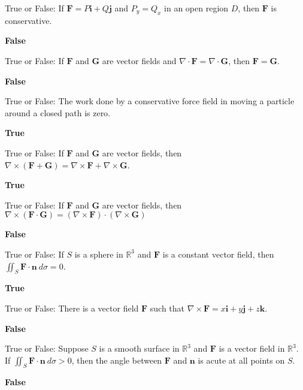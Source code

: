 \documentclass{exam}
\newcommand{\R}{\mathbb{R}}
\newcommand{\bi}{\mathbf{i}}
\newcommand{\bj}{\mathbf{j}}
\newcommand{\bk}{\mathbf{k}}
\newcommand{\bn}{\mathbf{n}}
\newcommand{\bF}{\mathbf{F}}
\newcommand{\bG}{\mathbf{G}}
\begin{document}
\begin{questions}
		\question True or False: If $\bF = P\bi+Q\bj$ and $P_y=Q_x$ in an open region $D$, then $\bF$ is conservative.
		\begin{solution}
			\textbf{False}
		\end{solution}
	
		\question True or False: If $\bF$ and $\bG$ are vector fields and $\nabla \cdot \bF = \nabla \cdot \bG$, then $\bF=\bG$.
		\begin{solution}
			\textbf{False}
		\end{solution}
	
		\question True or False: The work done by a conservative force field in moving a particle around a closed path is zero.
		\begin{solution}
			\textbf{True}
		\end{solution}
	
		\question True or False: If $\bF$ and $\bG$ are vector fields, then $\nabla \times (\bF+\bG)=\nabla \times \bF + \nabla \times \bG$.
		\begin{solution}
			\textbf{True}
		\end{solution}
	
		\question True or False: If $\bF$ and $\bG$ are vector fields, then $\nabla \times (\bF\cdot\bG)=(\nabla \times \bF)\cdot(\nabla\times \bG)$
		\begin{solution}
			\textbf{False}
		\end{solution}
	
		\question True or False: If $S$ is a sphere in $\R^3$ and $\bF$ is a constant vector field, then $\iint_S \bF\cdot\bn\  d\sigma =0$.
		\begin{solution}
			\textbf{True}
		\end{solution}
	
		\question True or False: There is a vector field $\bF$ such that $\nabla \times \bF = x\bi+y\bj+z\bk$.
		\begin{solution}
			\textbf{False}
		\end{solution}
	
		\question True or False: Suppose $S$ is a smooth surface in $\R^3$ and $\bF$ is a vector field in $\R^3$.  If $\iint_S \bF\cdot\bn\ d\sigma>0$, then the angle between $\bF$ and $\bn$ is acute at all points on $S$.
		\begin{solution}
			\textbf{False}
		\end{solution}
	\end{questions}
	
\end{document}
